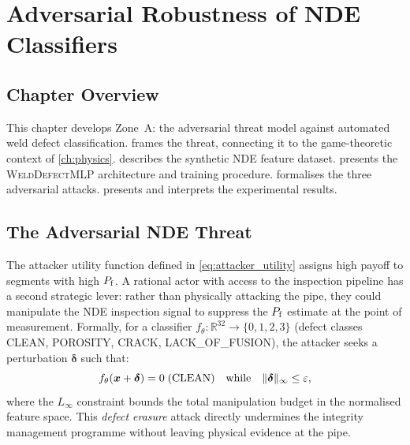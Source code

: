 
\chapter{Adversarial Robustness of NDE Classifiers}
\label{ch:adversarial}

\section{Chapter Overview}
\label{sec:adv_overview}

This chapter develops Zone~A: the adversarial threat model against
automated weld defect classification.   frames
the threat, connecting it to the game-theoretic context of
\cref{ch:physics}.   describes the synthetic NDE
feature dataset.   presents the \textsc{WeldDefectMLP}
architecture and training procedure.   formalises
the three adversarial attacks.   presents and
interprets the experimental results.

\section{The Adversarial NDE Threat}
\label{sec:adv_threat}

The attacker utility function defined in \cref{eq:attacker_utility}
assigns high payoff to segments with high $P_{\mathrm{f}}$.  A rational actor with
access to the inspection pipeline has a second strategic lever: rather
than physically attacking the pipe, they could manipulate the
\ac{NDE} inspection signal to suppress the $P_{\mathrm{f}}$ estimate at the point
of measurement.  Formally, for a classifier
$f_\theta: \mathbb{R}^{32} \to \{0,1,2,3\}$ (defect classes
CLEAN, POROSITY, CRACK, LACK\_OF\_FUSION), the attacker seeks a
perturbation $\bm{\delta}$ such that:
\begin{equation}
  f_\theta(\bm{x} + \bm{\delta}) = 0 \;(\mathrm{CLEAN})
  \quad \text{while} \quad
  \|\bm{\delta}\|_\infty \leq \varepsilon,
  \label{eq:adv_objective}
\end{equation}
where the $L_\infty$ constraint bounds the total manipulation budget
in the normalised feature space.  This \emph{defect erasure} attack
directly undermines the integrity management programme without leaving
physical evidence at the pipe.


